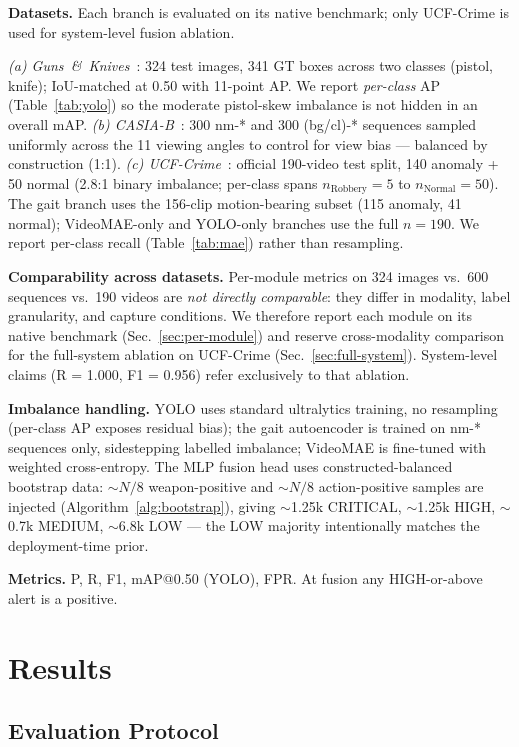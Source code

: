 \documentclass[runningheads]{llncs}
\begin{document}
\textbf{Datasets.} Each branch is evaluated on its native benchmark; only UCF-Crime is used for system-level fusion ablation.

\emph{(a) Guns~\&~Knives}~\cite{gunsknives}: 324 test images, 341 GT boxes across two classes (pistol, knife); IoU-matched at 0.50 with 11-point AP. We report \emph{per-class} AP (Table~\ref{tab:yolo}) so the moderate pistol-skew imbalance is not hidden in an overall mAP. \emph{(b) CASIA-B}~\cite{casiab}: 300 nm-* and 300 (bg/cl)-* sequences sampled uniformly across the 11 viewing angles to control for view bias --- balanced by construction (1:1). \emph{(c) UCF-Crime}~\cite{ucfcrime}: official 190-video test split, 140 anomaly + 50 normal (2.8:1 binary imbalance; per-class spans $n_\text{Robbery}\!=\!5$ to $n_\text{Normal}\!=\!50$). The gait branch uses the 156-clip motion-bearing subset (115 anomaly, 41 normal); VideoMAE-only and YOLO-only branches use the full $n=190$. We report per-class recall (Table~\ref{tab:mae}) rather than resampling.

\textbf{Comparability across datasets.} Per-module metrics on 324 images vs.\ 600 sequences vs.\ 190 videos are \emph{not directly comparable}: they differ in modality, label granularity, and capture conditions. We therefore report each module on its native benchmark (Sec.~\ref{sec:per-module}) and reserve cross-modality comparison for the full-system ablation on UCF-Crime (Sec.~\ref{sec:full-system}). System-level claims (R = 1.000, F1 = 0.956) refer exclusively to that ablation.

\textbf{Imbalance handling.} YOLO uses standard ultralytics training, no resampling (per-class AP exposes residual bias); the gait autoencoder is trained on nm-* sequences only, sidestepping labelled imbalance; VideoMAE is fine-tuned with weighted cross-entropy. The MLP fusion head uses constructed-balanced bootstrap data: $\sim N/8$ weapon-positive and $\sim N/8$ action-positive samples are injected (Algorithm~\ref{alg:bootstrap}), giving $\sim$1.25k CRITICAL, $\sim$1.25k HIGH, $\sim$0.7k MEDIUM, $\sim$6.8k LOW --- the LOW majority intentionally matches the deployment-time prior.

\textbf{Metrics.} P, R, F1, mAP@0.50 (YOLO), FPR. At fusion any HIGH-or-above alert is a positive.

\section{Results}\label{sec:results}

\subsection{Evaluation Protocol}\label{sec:eval-protocol}
\end{document}
